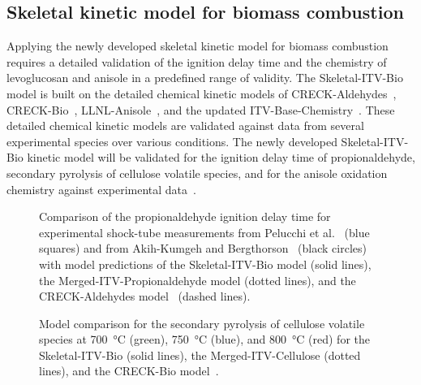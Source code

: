 \begin{refsection}
\subsection{Skeletal kinetic model for biomass combustion}
Applying the newly developed skeletal kinetic model for biomass combustion requires a detailed validation of the ignition delay time and the chemistry of levoglucosan and anisole in a predefined range of validity. The Skeletal-ITV-Bio model is built on the detailed chemical kinetic models of CRECK-Aldehydes~\cite{Pelucchi2015}, CRECK-Bio~\cite{Debiagi2016}, LLNL-Anisole~\cite{Wagnon2018}, and the updated ITV-Base-Chemistry~\cite{Langer2023}. These detailed chemical kinetic models are validated against data from several experimental species over various conditions. The newly developed Skeletal-ITV-Bio kinetic model will be validated for the ignition delay time of propionaldehyde, secondary pyrolysis of cellulose volatile species, and for the anisole oxidation chemistry against experimental data~\cite{Pelucchi2015, AkihKumgeh2011, Chen2022}.
\begin{figure}[h]
  \centering
  \hfill
  \hfill
  \caption{Comparison of the propionaldehyde ignition delay time for experimental shock-tube measurements from Pelucchi et al.~\cite{Pelucchi2015} (blue squares) and from Akih-Kumgeh and Bergthorson~\cite{AkihKumgeh2011} (black circles) with model predictions of the Skeletal-ITV-Bio model (solid lines), the Merged-ITV-Propionaldehyde model (dotted lines), and the CRECK-Aldehydes model~\cite{Pelucchi2015} (dashed lines).}
  \label{fig:B1bIDTPropionaldehydeBioMechanism}
\end{figure}
\begin{figure}[t]
  \centering
  \hfill
  \hfill
  \caption{Model comparison for the secondary pyrolysis of cellulose volatile species at \SI{700}{\celsius} (green), \SI{750}{\celsius} (blue), and \SI{800}{\celsius} (red) for the Skeletal-ITV-Bio (solid lines), the Merged-ITV-Cellulose (dotted lines), and the CRECK-Bio model~\cite{Debiagi2016}.}

\end{figure}
\end{refsection}
